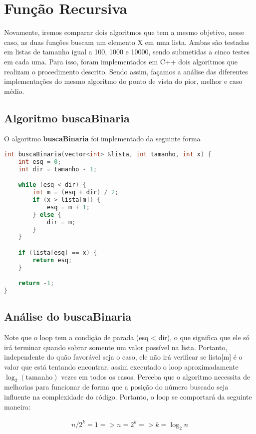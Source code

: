 \section{Função Recursiva}
\label{sec:func-rec}

Novamente, iremos comparar dois algoritmos que tem a mesmo objetivo, nesse caso, as duas funções buscam um elemento X em uma lista. Ambas são testadas em listas de tamanho igual a 100, 1000 e 10000, sendo submetidas a cinco testes em cada uma. Para isso, foram implementados em C++ dois algoritmos que realizam o procedimento descrito. Sendo assim, façamos a análise das diferentes implementações do mesmo algoritmo do ponto de vista do pior, melhor e caso médio.

\subsection{Algoritmo buscaBinaria}

O algoritmo \textbf{buscaBinaria} foi implementado da seguinte forma

\begin{lstlisting}[language=C++]
int buscaBinaria(vector<int> &lista, int tamanho, int x) {
    int esq = 0; 
    int dir = tamanho - 1;

    while (esq < dir) {
        int m = (esq + dir) / 2; 
        if (x > lista[m]) {
            esq = m + 1;
        } else {
            dir = m;
        }
    }

    if (lista[esq] == x) {
        return esq; 
    }

    return -1;
}
\end{lstlisting}

\subsection{Análise do buscaBinaria}

Note que o loop tem a condição de parada (esq < dir), o que significa que ele só irá terminar quando sobrar somente um valor possível na lista. Portanto, independente do quão favorável seja o caso, ele não irá verificar se lista[m] é o valor que está tentando encontrar, assim executado o loop aproximadamente $\log_ 2(\text{tamanho})$ vezes em todos os casos. Perceba que o algoritmo necessita de melhorias para funcionar de forma que a posição do número buscado seja influente na complexidade do código. Portanto, o loop se comportará da seguinte maneira:

\begin{align*}
        n/2^k = 1 
       => n = 2^k
       => k = \log_2 n
\end{align*}

